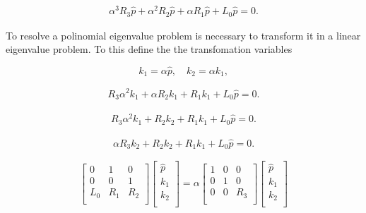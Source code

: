 \begin{equation} 
\begin{split}
\alpha^3
R_3
\hat{p}
+ 
\alpha^2 
R_2
\hat{p}
+
\alpha 
R_1
\hat{p}
+
L_0
\hat{p}
=
0
.
\end{split}
\end{equation} 

To resolve a polinomial eigenvalue problem is 
necessary to transform it in a linear eigenvalue problem. 
To this  define the the transfomation variables    

\begin{equation} 
    k_1=\alpha \hat{p} 
    ,
    \quad
    k_2=\alpha k_1 
    ,
\end{equation} 

\begin{equation} 
\begin{split}
R_3
\alpha^2
k_1
+ 
\alpha 
R_2
k_1
+
R_1
k_1
+
L_0
\hat{p}
=
0
.
\end{split}
\end{equation} 

\begin{equation} 
\begin{split}
R_3
\alpha^2
k_1
+ 
R_2
k_2
+
R_1
k_1
+
L_0
\hat{p}
=
0
.
\end{split}
\end{equation} 

\begin{equation} 
\begin{split}
\alpha
R_3
k_2
+ 
R_2
k_2
+
R_1
k_1
+
L_0
\hat{p}
=
0
.
\end{split}
\end{equation} 


\begin{equation*}
    \begin{bmatrix}
    0   &1&0\\
    0   &0&1\\
    L_0 &R_1&R_2\\
    \end{bmatrix}
    \begin{bmatrix}
    \hat{p}\\
    k_1    \\
    k_2    \\
    \end{bmatrix}
    =
    \alpha 
    \begin{bmatrix}
    1  &0&0\\
    0  &1&0\\
    0  &0&R_3\\
    \end{bmatrix}
    \begin{bmatrix}
    \hat{p}\\
    k_1    \\
    k_2    \\
    \end{bmatrix}
\end{equation*}

